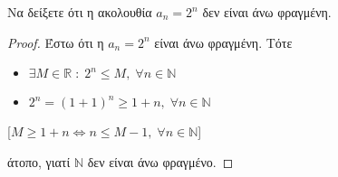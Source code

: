 \documentclass[a4paper,table]{report}
\begin{document}
\begin{enumerate}
  \item Να δείξετε ότι η ακολουθία $ a_{n} = 2^{n} $ δεν είναι άνω 
    φραγμένη.
    \begin{proof}
    \item {} 
      Έστω ότι η $ a_{n}=2^{n} $ είναι άνω φραγμένη. Τότε 

      \begin{minipage}{0.35\textwidth}
        \begin{itemize}
          \item $ \exists M \in \mathbb{R} \; : \; 2^{n} \leq M, \; 
            \forall n \in \mathbb{N} $ \hfill {}
          \item $ 2^{n}=(1+1)^{n} \geq 1+n, \; \forall n \in 
            \mathbb{N} $ \hfill {}
        \end{itemize}    
      \end{minipage}
      [$ M \geq 1+n \Leftrightarrow n \leq M-1, \; 
      \forall n \in \mathbb{N} $] 

      άτοπο, γιατί $ \mathbb{N} $ δεν είναι άνω φραγμένο.
    \end{proof}






\end{enumerate}
\end{document}
